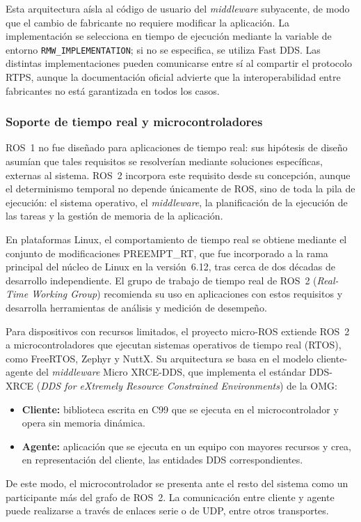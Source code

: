 Esta arquitectura aísla al código de usuario del \textit{middleware}
subyacente, de modo que el cambio de fabricante no requiere modificar la
aplicación. La implementación se selecciona en tiempo de ejecución mediante la
variable de entorno \texttt{RMW\_IMPLEMENTATION}; si no se especifica, se
utiliza Fast DDS. Las distintas implementaciones pueden comunicarse entre sí al
compartir el protocolo RTPS, aunque la documentación oficial advierte que la
interoperabilidad entre fabricantes no está garantizada en todos los casos.

\subsubsection{Soporte de tiempo real y microcontroladores}

ROS~1 no fue diseñado para aplicaciones de tiempo real: sus hipótesis de diseño
asumían que tales requisitos se resolverían mediante soluciones específicas,
externas al sistema. ROS~2 incorpora este requisito desde su concepción,
aunque el determinismo temporal no depende únicamente de ROS, sino de toda la
pila de ejecución: el sistema operativo, el \textit{middleware}, la
planificación de la ejecución de las tareas y la gestión de memoria de la
aplicación.

En plataformas Linux, el comportamiento de tiempo real se obtiene mediante el
conjunto de modificaciones PREEMPT\_RT, que fue incorporado a la rama
principal del núcleo de Linux en la versión~6.12, tras cerca de dos décadas de
desarrollo independiente. El grupo de trabajo de tiempo real de ROS~2
(\textit{Real-Time Working Group}) recomienda su uso en aplicaciones con estos
requisitos y desarrolla herramientas de análisis y medición de desempeño.

Para dispositivos con recursos limitados, el proyecto micro-ROS extiende ROS~2
a microcontroladores que ejecutan sistemas operativos de tiempo real (RTOS),
como FreeRTOS, Zephyr y NuttX. Su arquitectura se basa en el modelo
cliente-agente del \textit{middleware} Micro XRCE-DDS, que implementa el
estándar DDS-XRCE (\textit{DDS for eXtremely Resource Constrained
Environments}) de la OMG:
\begin{itemize}
    \item \textbf{Cliente:} biblioteca escrita en C99 que se ejecuta en el
    microcontrolador y opera sin memoria dinámica.
    \item \textbf{Agente:} aplicación que se ejecuta en un equipo con mayores
    recursos y crea, en representación del cliente, las entidades DDS
    correspondientes.
\end{itemize}
De este modo, el microcontrolador se presenta ante el resto del sistema como
un participante más del grafo de ROS~2. La comunicación entre cliente y agente
puede realizarse a través de enlaces serie o de UDP, entre otros transportes.

